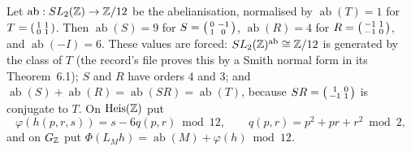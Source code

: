 Let $\operatorname{ab}:SL_2(\mathbb{Z})\to\mathbb{Z}/12$ be the abelianisation, normalised by $\operatorname{ab}(T)=1$ for $T=\begin{psmallmatrix}1&1\\0&1\end{psmallmatrix}$. Then $\operatorname{ab}(S)=9$ for $S=\begin{psmallmatrix}0&-1\\1&0\end{psmallmatrix}$, $\operatorname{ab}(R)=4$ for $R=\begin{psmallmatrix}-1&1\\-1&0\end{psmallmatrix}$, and $\operatorname{ab}(-I)=6$. These values are forced: $SL_2(\mathbb{Z})^{\mathrm{ab}}\cong\mathbb{Z}/12$ is generated by the class of $T$ (the record's file  proves this by a Smith normal form in its Theorem~6.1); $S$ and $R$ have orders $4$ and $3$; and $\operatorname{ab}(S)+\operatorname{ab}(R)=\operatorname{ab}(SR)=\operatorname{ab}(T)$, because $SR=\begin{psmallmatrix}1&0\\-1&1\end{psmallmatrix}$ is conjugate to $T$. On $\mathrm{Heis}(\mathbb{Z})$ put
\[
\varphi(h(p,r,s))=s-6q(p,r)\bmod12,\qquad q(p,r)=p^2+pr+r^2\bmod2,
\]
and on $G_{\mathbb{Z}}$ put $\Phi(L_Mh)=\operatorname{ab}(M)+\varphi(h)\bmod12$.

